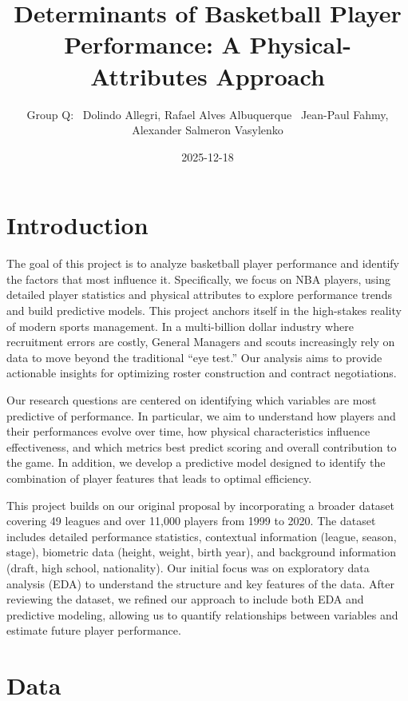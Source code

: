\documentclass[
  letterpaper,
  DIV=11,
  numbers=noendperiod]{scrartcl}
\title{Determinants of Basketball Player Performance: A
Physical-Attributes Approach}
\author{Group Q: ~Dolindo Allegri, Rafael Alves Albuquerque ~Jean-Paul
Fahmy, Alexander Salmeron Vasylenko}
\date{2025-12-18}
\renewcommand*\contentsname{Table of contents}
\newcommand\contentsname{Table of contents}
\begin{document}
\maketitle

\renewcommand*\contentsname{Table of contents}
{
\hypersetup{linkcolor=}
\setcounter{tocdepth}{3}
\tableofcontents
}

\section{Introduction}\label{introduction}

The goal of this project is to analyze basketball player performance and
identify the factors that most influence it. Specifically, we focus on
NBA players, using detailed player statistics and physical attributes to
explore performance trends and build predictive models. This project
anchors itself in the high-stakes reality of modern sports management.
In a multi-billion dollar industry where recruitment errors are costly,
General Managers and scouts increasingly rely on data to move beyond the
traditional ``eye test.'' Our analysis aims to provide actionable
insights for optimizing roster construction and contract negotiations.

Our research questions are centered on identifying which variables are
most predictive of performance. In particular, we aim to understand how
players and their performances evolve over time, how physical
characteristics influence effectiveness, and which metrics best predict
scoring and overall contribution to the game. In addition, we develop a
predictive model designed to identify the combination of player features
that leads to optimal efficiency.

This project builds on our original proposal by incorporating a broader
dataset covering 49 leagues and over 11,000 players from 1999 to 2020.
The dataset includes detailed performance statistics, contextual
information (league, season, stage), biometric data (height, weight,
birth year), and background information (draft, high school,
nationality). Our initial focus was on exploratory data analysis (EDA)
to understand the structure and key features of the data. After
reviewing the dataset, we refined our approach to include both EDA and
predictive modeling, allowing us to quantify relationships between
variables and estimate future player performance.

\section{Data}\label{data}
\end{document}
